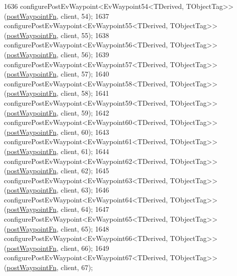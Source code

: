 \begin{DoxyCode}
1636     configurePostEvWaypoint<EvWaypoint54<TDerived, TObjectTag>>(\hyperlink{classmove__base__z__client_1_1WaypointEventDispatcher_acc538eb7506c13f7cca2268a1742dadd}{postWaypointFn}, client, 54);
1637     configurePostEvWaypoint<EvWaypoint55<TDerived, TObjectTag>>(\hyperlink{classmove__base__z__client_1_1WaypointEventDispatcher_acc538eb7506c13f7cca2268a1742dadd}{postWaypointFn}, client, 55);
1638     configurePostEvWaypoint<EvWaypoint56<TDerived, TObjectTag>>(\hyperlink{classmove__base__z__client_1_1WaypointEventDispatcher_acc538eb7506c13f7cca2268a1742dadd}{postWaypointFn}, client, 56);
1639     configurePostEvWaypoint<EvWaypoint57<TDerived, TObjectTag>>(\hyperlink{classmove__base__z__client_1_1WaypointEventDispatcher_acc538eb7506c13f7cca2268a1742dadd}{postWaypointFn}, client, 57);
1640     configurePostEvWaypoint<EvWaypoint58<TDerived, TObjectTag>>(\hyperlink{classmove__base__z__client_1_1WaypointEventDispatcher_acc538eb7506c13f7cca2268a1742dadd}{postWaypointFn}, client, 58);
1641     configurePostEvWaypoint<EvWaypoint59<TDerived, TObjectTag>>(\hyperlink{classmove__base__z__client_1_1WaypointEventDispatcher_acc538eb7506c13f7cca2268a1742dadd}{postWaypointFn}, client, 59);
1642     configurePostEvWaypoint<EvWaypoint60<TDerived, TObjectTag>>(\hyperlink{classmove__base__z__client_1_1WaypointEventDispatcher_acc538eb7506c13f7cca2268a1742dadd}{postWaypointFn}, client, 60);
1643     configurePostEvWaypoint<EvWaypoint61<TDerived, TObjectTag>>(\hyperlink{classmove__base__z__client_1_1WaypointEventDispatcher_acc538eb7506c13f7cca2268a1742dadd}{postWaypointFn}, client, 61);
1644     configurePostEvWaypoint<EvWaypoint62<TDerived, TObjectTag>>(\hyperlink{classmove__base__z__client_1_1WaypointEventDispatcher_acc538eb7506c13f7cca2268a1742dadd}{postWaypointFn}, client, 62);
1645     configurePostEvWaypoint<EvWaypoint63<TDerived, TObjectTag>>(\hyperlink{classmove__base__z__client_1_1WaypointEventDispatcher_acc538eb7506c13f7cca2268a1742dadd}{postWaypointFn}, client, 63);
1646     configurePostEvWaypoint<EvWaypoint64<TDerived, TObjectTag>>(\hyperlink{classmove__base__z__client_1_1WaypointEventDispatcher_acc538eb7506c13f7cca2268a1742dadd}{postWaypointFn}, client, 64);
1647     configurePostEvWaypoint<EvWaypoint65<TDerived, TObjectTag>>(\hyperlink{classmove__base__z__client_1_1WaypointEventDispatcher_acc538eb7506c13f7cca2268a1742dadd}{postWaypointFn}, client, 65);
1648     configurePostEvWaypoint<EvWaypoint66<TDerived, TObjectTag>>(\hyperlink{classmove__base__z__client_1_1WaypointEventDispatcher_acc538eb7506c13f7cca2268a1742dadd}{postWaypointFn}, client, 66);
1649     configurePostEvWaypoint<EvWaypoint67<TDerived, TObjectTag>>(\hyperlink{classmove__base__z__client_1_1WaypointEventDispatcher_acc538eb7506c13f7cca2268a1742dadd}{postWaypointFn}, client, 67);

\end{DoxyCode}
